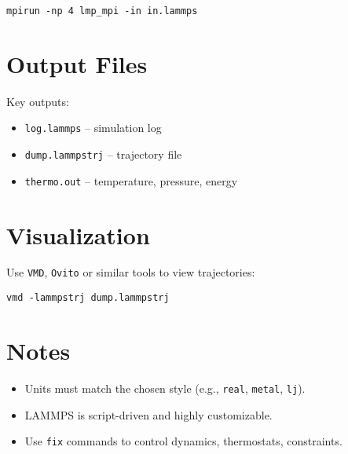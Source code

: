 \begin{verbatim}
mpirun -np 4 lmp_mpi -in in.lammps
\end{verbatim}

\section{Output Files}

Key outputs:

\begin{itemize}
    \item \texttt{log.lammps} – simulation log
    \item \texttt{dump.lammpstrj} – trajectory file
    \item \texttt{thermo.out} – temperature, pressure, energy
\end{itemize}

\section{Visualization}

Use \texttt{VMD}, \texttt{Ovito} or similar tools to view trajectories:

\begin{verbatim}
vmd -lammpstrj dump.lammpstrj
\end{verbatim}

\section*{Notes}
\begin{itemize}
    \item Units must match the chosen style (e.g., \texttt{real}, \texttt{metal}, \texttt{lj}).
    \item LAMMPS is script-driven and highly customizable.
    \item Use \texttt{fix} commands to control dynamics, thermostats, constraints.
\end{itemize}
